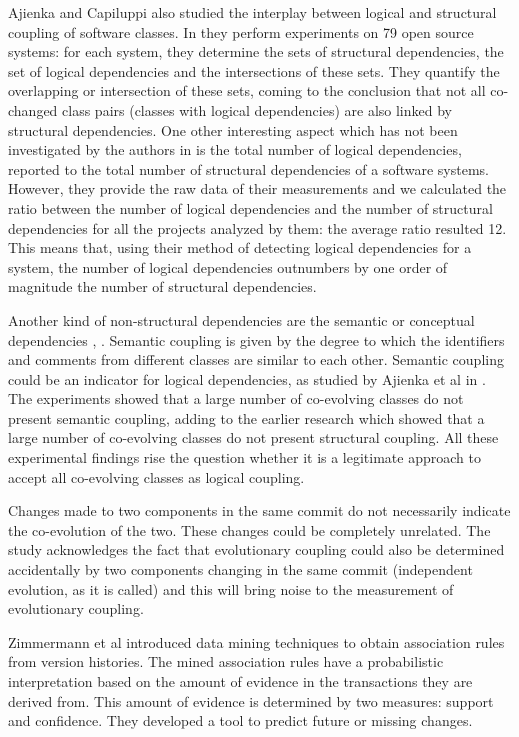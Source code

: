 \documentclass[a4paper,twoside]{article}
\begin{document}
Ajienka and Capiluppi also studied the interplay between logical and structural coupling of software classes. In \cite{DBLP:journals/jss/AjienkaC17} they  perform experiments on 79 open source systems: for each system, they determine the sets of structural dependencies, the set of logical dependencies and the intersections of these sets. They quantify the overlapping or intersection of these sets, coming to the conclusion that not all co-changed class pairs (classes with logical dependencies) are also linked by structural dependencies. One other interesting aspect which has not been investigated by the authors in \cite{DBLP:journals/jss/AjienkaC17}  is the total number of logical dependencies, reported to the total number of structural dependencies of a software systems. However, they provide the raw data of their measurements and we calculated the ratio between the number of logical dependencies and the number of structural dependencies for all the projects analyzed by them: the average ratio resulted 12.  This means that, using their method of detecting logical dependencies for a system, the number of logical dependencies outnumbers by one order of magnitude the number of structural dependencies. 


Another kind of non-structural dependencies are the semantic or conceptual dependencies \cite{Poshyvanyk2009}, \cite{posh2010}. Semantic coupling is given by the degree to which the identifiers
and comments from different classes are similar to each other. Semantic coupling could be an indicator for logical dependencies, as studied by Ajienka et al in \cite{DBLP:journals/ese/AjienkaCC18}. The experiments showed that a large number of co-evolving classes do not present semantic coupling, adding to the earlier research which showed that a large number of co-evolving classes do not present structural coupling. All these experimental findings rise the question whether it is a legitimate approach to accept all co-evolving classes as logical coupling.


Changes made to two components in the same commit do not necessarily indicate the co-evolution of the two. These changes could be completely unrelated. The study \cite{Yu2007} acknowledges the fact that evolutionary coupling could also be determined accidentally by two components changing in the same commit (independent evolution, as it is called) and this will bring noise to the measurement of evolutionary coupling. 


Zimmermann et al \cite{Zimmermann:2004:MVH:998675.999460} introduced data mining techniques to obtain association
rules from version histories.
The mined association rules  have a probabilistic interpretation based on the amount of
evidence in the transactions they are derived from. This
amount of evidence is determined by two measures: 
support and confidence.  They developed a tool to predict future or
missing changes.
\end{document}
